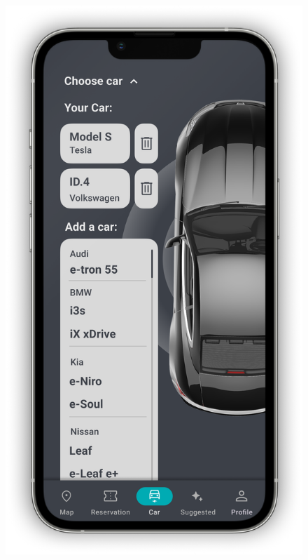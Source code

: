 \begin{figure}[H]
{        \includegraphics[scale=0.32]{src/mockups/car_add.png}
    }
    \newline
    \subfloat[Reservations]{
}
\end{figure}
